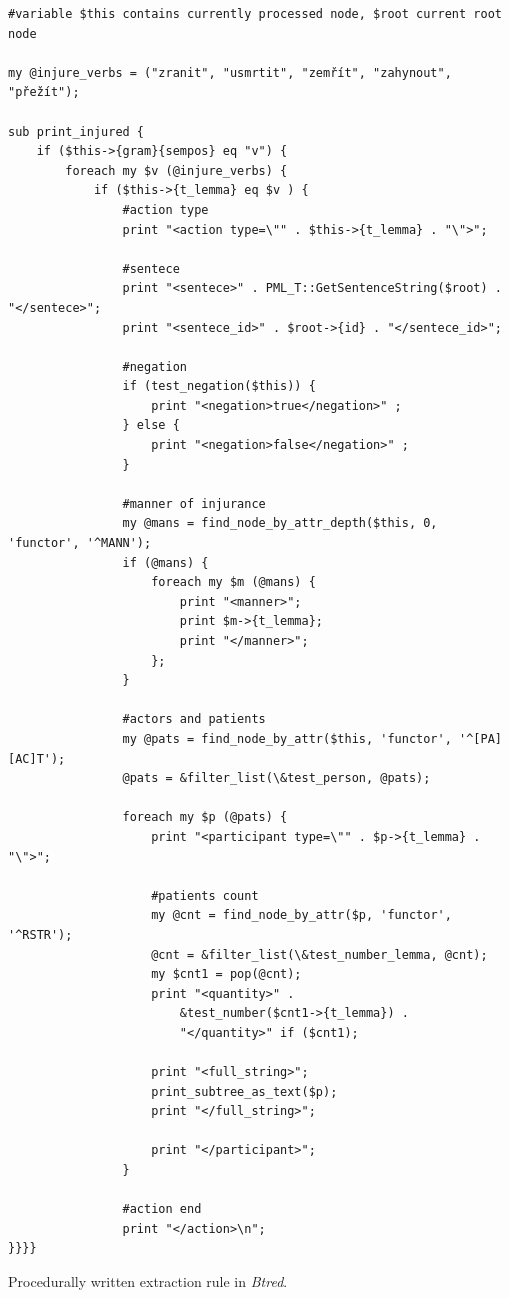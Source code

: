 \begin{listing}[ht]
\begin{verbatim}
#variable $this contains currently processed node, $root current root node

my @injure_verbs = ("zranit", "usmrtit", "zemřít", "zahynout", "přežít");

sub print_injured {
	if ($this->{gram}{sempos} eq "v") {
		foreach my $v (@injure_verbs) {
			if ($this->{t_lemma} eq $v ) {
				#action type
				print "<action type=\"" . $this->{t_lemma} . "\">";

				#sentece
				print "<sentece>" . PML_T::GetSentenceString($root) . "</sentece>";
				print "<sentece_id>" . $root->{id} . "</sentece_id>";
				
				#negation
				if (test_negation($this)) {
					print "<negation>true</negation>" ;					
				} else {
					print "<negation>false</negation>" ;										
				}
								
				#manner of injurance
				my @mans = find_node_by_attr_depth($this, 0, 'functor', '^MANN');
				if (@mans) {
					foreach my $m (@mans) {
						print "<manner>"; 
						print $m->{t_lemma};
						print "</manner>"; 
					};
				}
				
				#actors and patients
				my @pats = find_node_by_attr($this, 'functor', '^[PA][AC]T');
				@pats = &filter_list(\&test_person, @pats);
				
				foreach my $p (@pats) {
					print "<participant type=\"" . $p->{t_lemma} . "\">";

					#patients count
					my @cnt = find_node_by_attr($p, 'functor', '^RSTR');
					@cnt = &filter_list(\&test_number_lemma, @cnt);
					my $cnt1 = pop(@cnt);
					print "<quantity>" . 
						&test_number($cnt1->{t_lemma}) . 
						"</quantity>" if ($cnt1);
	
					print "<full_string>";
					print_subtree_as_text($p);
					print "</full_string>";

					print "</participant>";
				}
				
				#action end
				print "</action>\n";											
}}}}
\end{verbatim} 

\caption{Procedurally written extraction rule in \emph{Btred}.}
\label{lst:btred_rule}
\end{listing}




